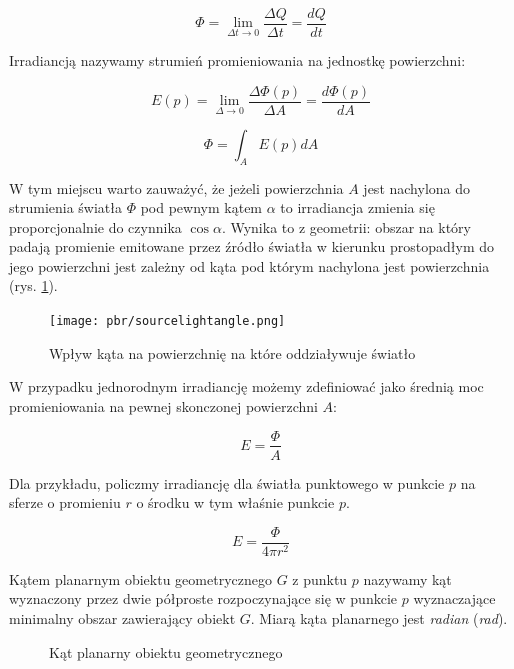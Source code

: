 \documentclass[../main.tex]{subfiles}
\begin{document}
$$
\Phi = \lim_{\Delta t \rightarrow 0}{
    \frac{\Delta Q}{\Delta t}=\frac{dQ}{dt}
}
$$

Irradiancją nazywamy strumień promieniowania na jednostkę powierzchni:

$$
E(p) =
    \lim_{\Delta \rightarrow 0} {
        \frac{\Delta \Phi(p)}{\Delta A}
    } =
    \frac{d\Phi(p)}{dA}
$$

$$
\Phi = \int_{A} {
    E(p)
    dA
}
$$

W tym miejscu warto zauważyć, że jeżeli powierzchnia $A$ jest nachylona do
strumienia światła $\Phi$ pod pewnym kątem $\alpha$ to irradiancja zmienia się
proporcjonalnie do czynnika $\cos \alpha$. Wynika to z geometrii: obszar na
który padają promienie emitowane przez źródło światła w kierunku prostopadłym
do jego powierzchni jest zależny od kąta pod którym nachylona jest
powierzchnia (rys. \ref{fig:SourceLightAngle}).

\begin{figure}[ht]
  \centering
  \texttt{[image: pbr/sourcelightangle.png]}
  \caption{Wpływ kąta na powierzchnię na które oddziaływuje światło}
  \label{fig:SourceLightAngle}
\end{figure}

W przypadku jednorodnym irradiancję możemy zdefiniować jako średnią moc
promieniowania na pewnej skonczonej powierzchni $A$:

$$
E = \frac{\Phi}{A}
$$

Dla przykładu, policzmy irradiancję dla światła punktowego w punkcie $p$ na
sferze o promieniu $r$ o środku w tym właśnie punkcie $p$.

$$ E = \frac{\Phi}{4 \pi r^2} $$

Kątem planarnym obiektu geometrycznego $G$ z punktu $p$ nazywamy kąt wyznaczony
przez dwie półproste rozpoczynające się w punkcie $p$ wyznaczające minimalny
obszar zawierający obiekt $G$. Miarą kąta planarnego jest \textit{radian}
(\textit{rad}).

\begin{figure}[ht]
  \centering
  \caption{Kąt planarny obiektu geometrycznego}
  \label{fig:PlanarAngle}
\end{figure}
\end{document}
